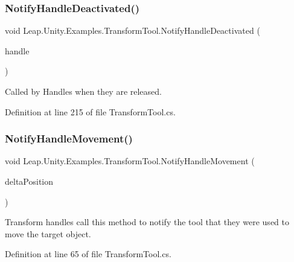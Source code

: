 \subsubsection{\texorpdfstring{NotifyHandleDeactivated()}{NotifyHandleDeactivated()}}
{\footnotesize\ttfamily void Leap.\+Unity.\+Examples.\+Transform\+Tool.\+Notify\+Handle\+Deactivated (\begin{DoxyParamCaption}\item[{\mbox{\hyperlink{class_leap_1_1_unity_1_1_examples_1_1_transform_handle}{Transform\+Handle}}}]{handle }\end{DoxyParamCaption})}



Called by Handles when they are released. 



Definition at line 215 of file Transform\+Tool.\+cs.

\mbox{\label{class_leap_1_1_unity_1_1_examples_1_1_transform_tool_a96a30f1c6f857af4f841608a41e5488d}} 
\subsubsection{\texorpdfstring{NotifyHandleMovement()}{NotifyHandleMovement()}}
{\footnotesize\ttfamily void Leap.\+Unity.\+Examples.\+Transform\+Tool.\+Notify\+Handle\+Movement (\begin{DoxyParamCaption}\item[{Vector3}]{delta\+Position }\end{DoxyParamCaption})}



Transform handles call this method to notify the tool that they were used to move the target object. 



Definition at line 65 of file Transform\+Tool.\+cs.

\mbox{\label{class_leap_1_1_unity_1_1_examples_1_1_transform_tool_a3c43fb470f2e6fcaadfbf05aba33d8ca}} 
